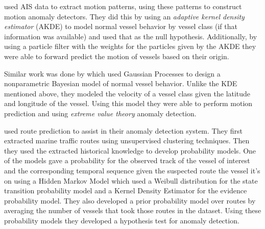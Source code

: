 \documentclass[bsc,frontabs,twoside,singlespacing,parskip,deptreport]{infthesis}     %
\begin{document}
\cite{ristic2008statistical} used AIS data to extract motion patterns, using these patterns to construct motion anomaly detectors. They did this by using an \emph{adaptive kernel density estimator} (AKDE) to model normal vessel behavior by vessel class (if that information was available) and used that as the null hypothesis. Additionally, by using a particle filter with the weights for the particles given by the AKDE they were able to forward predict the motion of vessels based on their origin.

Similar work was done by \cite{kowalska2012maritime} which used Gaussian Processes to design a nonparametric Bayesian model of normal vessel behavior.  Unlike the KDE mentioned above, they modeled the velocity of a vessel class given the latitude and longitude of the vessel.  Using this model they were able to perform motion prediction and using \emph{extreme value theory} anomaly detection.

\cite{pallotta2013vessel} used route prediction to assist in their anomaly detection system. They first extracted marine traffic routes using unsupervised clustering techniques. Then they used the extracted historical knowledge to develop probability models. One of the models gave a probability for the observed track of the vessel of interest and the corresponding temporal sequence given the suspected route the vessel it's on using a Hidden Markov Model which used a Weibull distribution for the state transition probability model and a Kernel Density Estimator for the evidence probability model. They also developed a prior probability model over routes by averaging the number of vessels that took those routes in the dataset. Using these probability models they developed a hypothesis test for anomaly detection.


\end{document}
